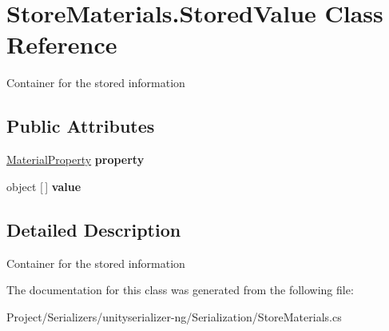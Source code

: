 \hypertarget{class_store_materials_1_1_stored_value}{}\section{Store\+Materials.\+Stored\+Value Class Reference}
\label{class_store_materials_1_1_stored_value}


Container for the stored information  


\subsection*{Public Attributes}
\begin{DoxyCompactItemize}
\item 
\mbox{\label{class_store_materials_1_1_stored_value_a4399961c9d06887dc2b790bcefc4f3c9}} 
\hyperlink{class_store_materials_1_1_material_property}{Material\+Property} {\bfseries property}
\item 
\mbox{\label{class_store_materials_1_1_stored_value_a715b959afd02d5e9d0e969d2d2dd785c}} 
object \mbox{[}$\,$\mbox{]} {\bfseries value}
\end{DoxyCompactItemize}


\subsection{Detailed Description}
Container for the stored information 



The documentation for this class was generated from the following file\+:\begin{DoxyCompactItemize}
\item 
Project/\+Serializers/unityserializer-\/ng/\+Serialization/Store\+Materials.\+cs\end{DoxyCompactItemize}
